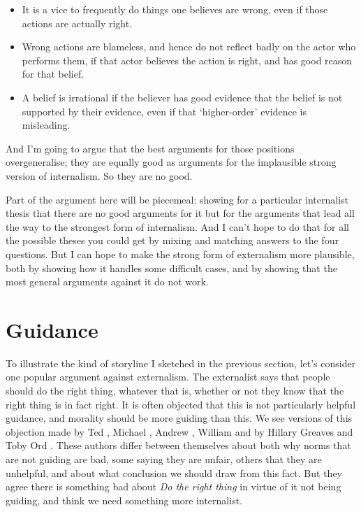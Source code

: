 \begin{itemize}
\item{} It is a vice to frequently do things one believes are wrong, even if those actions are actually right.

\item{} Wrong actions are blameless, and hence do not reflect badly on the actor who performs them, if that actor believes the action is right, and has good reason for that belief.

\item{} A belief is irrational if the believer has good evidence that the belief is not supported by their evidence, even if that `higher-order' evidence is misleading.

\end{itemize}
And I'm going to argue that the best arguments for those positions overgeneralise; they are equally good as arguments for the implausible strong version of internalism. So they are no good.

Part of the argument here will be piecemeal: showing for a particular internalist thesis that there are no good arguments for it but for the arguments that lead all the way to the strongest form of internalism. And I can't hope to do that for all the possible theses you could get by mixing and matching answers to the four questions. But I can hope to make the strong form of externalism more plausible, both by showing how it handles some difficult cases, and by showing that the most general arguments against it do not work.

\section{Guidance}
\label{guidance}

To illustrate the kind of storyline I sketched in the previous section, let's consider one popular argument against externalism. The externalist says that people should do the right thing, whatever that is, whether or not they know that the right thing is in fact right. It is often objected that this is not particularly helpful guidance, and morality should be more guiding than this. We see versions of this objection made by Ted \citet[8-9]{Lockhart2000}, Michael \citet[143]{Smith2006}, Andrew \citet[8]{Sepielli2009}, William \citet[7]{MacAskillThesis} and by Hillary Greaves and Toby Ord \citeyearpar{GreavesOrd2017}. These authors differ between themselves about both why norms that are not guiding are bad, some saying they are unfair, others that they are unhelpful, and about what conclusion we should draw from this fact. But they agree there is something bad about \emph{Do the right thing} in virtue of it not being guiding, and think we need something more internalist.

